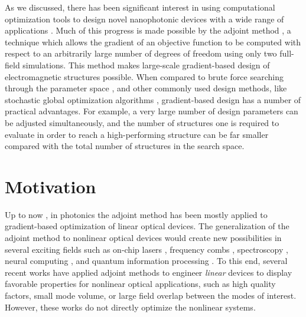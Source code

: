
As we discussed, there has been significant interest in using computational optimization tools to design novel nanophotonic devices with a wide range of applications \cite{lalau-keraly_adjoint_2013,wang_adjoint-based_2018,elesin_design_2012,piggott_fabrication-constrained_2017,piggott_inverse_2015,kao_maximizing_2005,hughes_method_2017, molesky_outlook_2018,sigmund_systematic_2003,matzen_systematic_2011,jensen_topology_2005,frellsen_topology_2016, shen_integrated-nanophotonics_2015,shen_design_2003, Minkov2014, Minkov2015, shi_optimization_2018,veronis_method_2004}. Much of this progress \cite{lalau-keraly_adjoint_2013,wang_adjoint-based_2018,elesin_design_2012,piggott_fabrication-constrained_2017,piggott_inverse_2015,kao_maximizing_2005,hughes_method_2017, molesky_outlook_2018,sigmund_systematic_2003,matzen_systematic_2011,jensen_topology_2005,frellsen_topology_2016} is made possible by the adjoint method \cite{giles2000introduction, veronis_method_2004}, a technique which allows the gradient of an objective function to be computed with respect to an arbitrarily large number of degrees of freedom using only two full-field simulations.  This method
makes large-scale gradient-based design of electromagnetic structures possible. When
compared to brute force searching through the parameter space \cite{shen_integrated-nanophotonics_2015}, and other commonly used design methods,
like stochastic global optimization algorithms \cite{shen_design_2003, Minkov2014, Minkov2015, shi_optimization_2018}, gradient-based design has a number of practical advantages. For example, a very large number of design parameters can be adjusted simultaneously, and the number of structures one is required to evaluate in order to reach a high-performing structure can be far smaller compared with the total number of structures in the search space. 

\section{Motivation}

Up to now \cite{hughes2018adjoint}, in photonics the adjoint method has been mostly applied to gradient-based optimization of linear optical devices. The generalization of the adjoint method to nonlinear optical devices would create new possibilities in several exciting fields such as on-chip lasers \cite{yamashita_raman_2015}, frequency combs \cite{okawachi_octave-spanning_2011}, spectroscopy \cite{moon_absolute_1997}, neural computing \cite{khoram2018stochastic}, and quantum information processing \cite{guo_-chip_2016}.  To this end, several recent works \cite{lin_cavity-enhanced_2016,lin_topology_2017,bravo-abad_enhanced_2007} have applied adjoint methods to engineer \textit{linear} devices to display favorable properties for nonlinear optical applications, such as high quality factors, small mode volume, or large field overlap between the modes of interest.  However, these works do not directly optimize the nonlinear systems.

